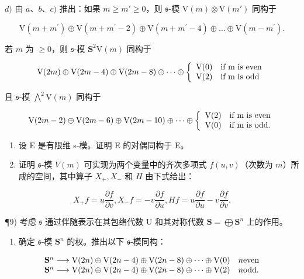 \(d)\) 由 \(a\)、\(b\)、\(c)\) 推出：如果 \(m \geq m' \geq 0\)，则 \(\mathfrak{s}\)-模 \(\mathrm{V}(m) \otimes \mathrm{V}(m')\) 同构于

\[
\mathrm{V} (m + m ^ {\prime}) \oplus \mathrm{V} (m + m ^ {\prime} - 2) \oplus \mathrm{V} (m + m ^ {\prime} - 4) \oplus \dots \oplus \mathrm{V} (m - m ^ {\prime}).
\]

若 \(m\) 为 \(\geq 0\)，则 \(\mathfrak{s}\)-模 \(\mathbf{S}^2\mathrm{V}(m)\) 同构于

\[
\mathrm{V} (2 m) \oplus \mathrm{V} (2 m - 4) \oplus \mathrm{V} (2 m - 8) \oplus \dots \oplus \left\{ \begin{array}{l l} \mathrm{V} (0) & \text {if m is even} \\ \mathrm{V} (2) & \text {if m is odd} \end{array} \right.
\]

且 \(\mathfrak{s}\)-模 \(\bigwedge^2\mathrm{V}(m)\) 同构于

\[
\mathrm{V} (2 m - 2) \oplus \mathrm{V} (2 m - 6) \oplus \mathrm{V} (2 m - 10) \oplus \dots \oplus \left\{ \begin{array}{l l} \mathrm{V} (2) & \text {if m is even} \\ \mathrm{V} (0) & \text {if m is odd.} \end{array} \right.
\]

\begin{enumerate}
\def\labelenumi{\arabic{enumi})}
\setcounter{enumi}{6}
\item
  设 E 是有限维 s-模。证明 E 的对偶同构于 E。
\item
  证明 \(\mathfrak{s}\)-模 \(V(m)\) 可实现为两个变量中的齐次多项式 \(f(u,v)\)（次数为 \(m\)）所成的空间，其中算子 \(X_{+}, X_{-}\) 和 \(H\) 由下式给出：
\end{enumerate}

\[
X _ {+} f = u \frac {\partial f}{\partial v}, X _ {-} f = - v \frac {\partial f}{\partial u}, H f = u \frac {\partial f}{\partial u} - v \frac {\partial f}{\partial v}.
\]

¶9) 考虑 \(\mathfrak{s}\) 通过伴随表示在其包络代数 U 和其对称代数 \(\mathbf{S} = \bigoplus \mathbf{S}^n\) 上的作用。

\begin{enumerate}
\def\labelenumi{\alph{enumi})}
\tightlist
\item
  确定 \(\mathfrak{s}\)-模 \(\mathbf{S}^n\) 的权。推出以下 \(\mathfrak{s}\)-模同构：
\end{enumerate}

\[
\begin{array}{l l} \mathbf {S} ^ {n} \longrightarrow \mathrm{V} (2 n) \oplus \mathrm{V} (2 n - 4) \oplus \mathrm{V} (2 n - 8) \oplus \dots \oplus \mathrm{V} (0) & n \text {even} \\ \mathbf {S} ^ {n} \longrightarrow \mathrm{V} (2 n) \oplus \mathrm{V} (2 n - 4) \oplus \mathrm{V} (2 n - 8) \oplus \dots \oplus \mathrm{V} (2) & n \text {odd}. \end{array}
\]

